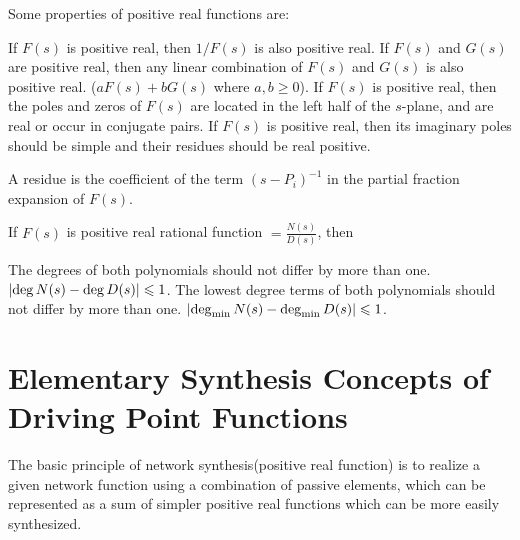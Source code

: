 \documentclass{report}
\begin{document}
Some properties of positive real functions are:

\begin{enumerate}
	\ii If $F(s)$ is positive real, then $1/F(s)$ is also positive real.
	\ii If $F(s)$ and $G(s)$ are positive real, then any linear combination of $F(s)$ and $G(s)$ is also positive real. ($aF(s) + bG(s)$ where $a,b \geq 0$).
	\ii If $F(s)$ is positive real, then the poles and zeros of $F(s)$ are located in the left half of the $s$-plane, and are real or occur in conjugate pairs.
	\ii If $F(s)$ is positive real, then its imaginary poles should be simple and their residues should be real positive.
	\begin{itemize}
		\ii A residue is the coefficient of the term $(s-P_i)^{-1}$ in the partial fraction expansion of $F(s)$.
	\end{itemize}
	\ii If $F(s)$ is positive real rational function $= \frac{N(s)}{D(s)}$, then
	\begin{itemize}
		\ii The degrees of both polynomials should not differ by more than one. $\abs{\deg N(s) - \deg D(s)} \leqslant 1$.
		\ii The lowest degree terms of both polynomials should not differ by more than one. $\abs{\deg_{\min} N(s) - \deg_{\min} D(s)} \leqslant 1$.
	\end{itemize}
\end{enumerate}


\chapter{Elementary Synthesis Concepts of Driving Point Functions}

The basic principle of network synthesis(positive real function) is to realize a given network function using a combination of passive elements, which can be represented as a sum of simpler positive real functions which can be more easily synthesized.
\end{document}
